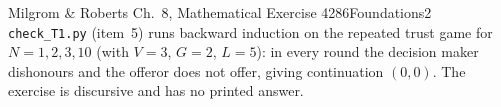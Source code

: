 \begin{exsol}{Milgrom \& Roberts Ch.~8, Mathematical Exercise 4}{286}{Foundations}{2}
\verify \texttt{check\_T1.py} (item~5) runs backward induction on the repeated trust game for $N = 1, 2,
3, 10$ (with $V = 3$, $G = 2$, $L = 5$): in every round the decision maker dishonours and the offeror does
not offer, giving continuation $(0,0)$. The exercise is discursive and has no printed answer.

\end{exsol}
